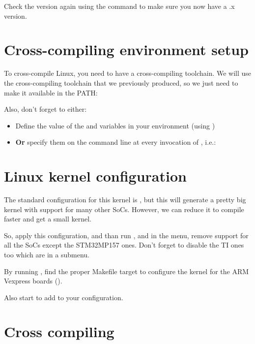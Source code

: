 Check the version again using the  command
to make sure you now have a \workingkernel.x version.

\section{Cross-compiling environment setup}

To cross-compile Linux, you need to have a cross-compiling
toolchain. We will use the cross-compiling toolchain that we
previously produced, so we just need to make it available in the PATH:


Also, don't forget to either:

\begin{itemize}
\item Define the value of the  and 
  variables in your environment (using )
\item {\bf Or} specify them on the command line at every invocation of
  , i.e.: 
\end{itemize}

\section{Linux kernel configuration}

{
The standard configuration for this kernel is ,
but this will generate a pretty big kernel with support for many other
SoCs. However, we can reduce it to compile faster and get a small
kernel.

So, apply this configuration, and than run ,
and in the  menu, remove support for all the
SoCs except the STM32MP157 ones. Don't forget to disable the TI ones
too which are in a submenu.
}
{
By running , find the proper Makefile target to
configure the kernel
{for the ARM Vexpress boards ().}
}

{Also start  to
add  to your configuration.}
{}

\section{Cross compiling}


